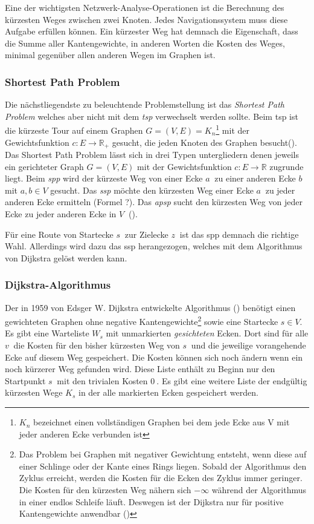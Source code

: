 Eine der wichtigsten Netzwerk-Analyse-Operationen ist die Berechnung des kürzesten Weges zwischen zwei Knoten.
Jedes Navigationssystem muss diese Aufgabe erfüllen können.
Ein kürzester Weg hat demnach die Eigenschaft, dass die Summe aller Kantengewichte, in anderen Worten die Kosten des Weges, minimal gegenüber allen anderen Wegen im Graphen ist.

\subsubsection{Shortest Path Problem}
Die nächstliegendste zu beleuchtende Problemstellung ist das \textit{Shortest Path Problem} welches aber nicht mit dem \textit{\gls{tsp}} verwechselt werden sollte.
Beim \gls{tsp} ist die kürzeste Tour auf einem Graphen $G = (V,E) = K_{n}$\footnote{$K_{n}$ bezeichnet einen vollständigen Graphen bei dem jede Ecke aus V mit jeder anderen Ecke verbunden ist} mit der Gewichtsfunktion $c: E \rightarrow \mathbb{R}_{+}$ gesucht, die jeden Knoten des Graphen besucht(\cite[135]{algorithms}).
Das Shortest Path Problem lässt sich in drei Typen untergliedern denen jeweils ein gerichteter Graph $G = (V,E)$ mit der Gewichtsfunktion $c: E \rightarrow \mathbb{R}$ zugrunde liegt.
Beim \textit{\gls{spp}} wird der kürzeste Weg von einer Ecke $a~$ zu einer anderen Ecke $b~$ mit $a,b\in V$ gesucht.
Das \textit{\gls{ssp}} möchte den kürzesten Weg einer Ecke $a~$ zu jeder anderen Ecke ermitteln (Formel ?).
Das \textit{\gls{apsp}} sucht den kürzesten Weg von jeder Ecke zu jeder anderen Ecke in $V~$ (\cite[169\psq]{algorithms}).

Für eine Route von Startecke $s~$ zur Zielecke $z~$ ist das \gls{spp} demnach die richtige Wahl.
Allerdings wird dazu das \gls{ssp} herangezogen, welches mit dem Algorithmus von Dijkstra gelöst werden kann.


\subsubsection{Dijkstra-Algorithmus}
\label{sec:dijkstra}
Der in 1959 von Edsger W. Dijkstra entwickelte Algorithmus (\cite{dijkstra}) benötigt einen gewichteten Graphen ohne negative Kantengewichte\footnote{Das Problem bei Graphen mit negativer Gewichtung entsteht, wenn diese auf einer Schlinge oder der Kante eines Rings liegen.
Sobald der Algorithmus den Zyklus erreicht, werden die Kosten für die Ecken des Zyklus immer geringer.
Die Kosten für den kürzesten Weg nähern sich $-\infty $ während der Algorithmus in einer endlos Schleife läuft.
Deswegen ist der Dijkstra nur für positive Kantengewichte anwendbar (\cite[194\psq]{kurt})} sowie eine Startecke $s \in V$.
Es gibt eine Warteliste $W_{s}$ mit unmarkierten \textit{gesichteten} Ecken.
Dort sind für alle $v~$ die Kosten für den bisher kürzesten Weg von $s~$ und die jeweilige vorangehende Ecke auf diesem Weg gespeichert.
Die Kosten können sich noch ändern wenn ein noch kürzerer Weg gefunden wird.
Diese Liste enthält zu Beginn nur den Startpunkt $s~$ mit den trivialen Kosten $0~$.
Es gibt eine weitere Liste der endgültig kürzesten Wege $K_{s}$ in der alle markierten Ecken gespeichert werden.

